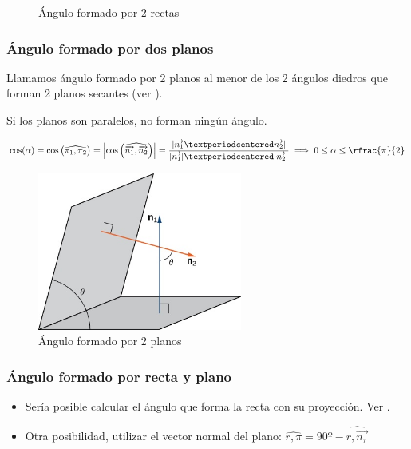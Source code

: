 \begin{figure}[H]
\centering
{}

\caption{Ángulo formado por 2 rectas}
\label{fig::ang-recta-recta}
\end{figure}


\subsubsection{Ángulo formado por dos planos}

Llamamos ángulo formado por 2 planos al menor de los 2 ángulos diedros que forman 2 planos secantes (ver ).

\obs Si los planos son paralelos, no forman ningún ángulo.

\[
\cos(\alpha) = \cos\left(\widehat{\pi_1,\pi_2}\right) = \left|\cos\left(\widehat{\vec{n_1},\vec{n_2}}\right)\right| = \frac{|\vec{n_1}·\vec{n_2}|}{|\vec{n_1}|·|\vec{n_2}|} \implies 0\leq \alpha \leq \rfrac{\pi}{2}
\]

\begin{figure}[H]
\centering
\includegraphics[width=0.6\textwidth]{img/angle-between-planes.jpeg}
%
\caption{Ángulo formado por 2 planos}
\label{fig::ang-plano-plano}
\end{figure}


\subsubsection{Ángulo formado por recta y plano}

\begin{itemize}
  \item Sería posible calcular el ángulo que forma la recta con su proyección. Ver .
  \item Otra posibilidad, utilizar el vector normal del plano: $\widehat{r,\pi} = 90º-\widehat{r,\vec{n_{\pi}}}$
\end{itemize}



